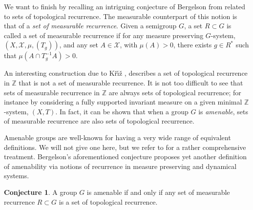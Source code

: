 \documentclass{amsart}
\numberwithin{equation}{section}
\theoremstyle{definition}
\newtheorem*{conjecture*}{Conjecture}
\theoremstyle{plain}
\newcommand{\Z}{{\mathbb Z}}
\begin{document}
We want to finish by recalling an intriguing conjecture 
of Bergelson 
from \cite{Bergelson} related to sets of topological 
recurrence. The measurable counterpart of this notion is
that of a \textit{set of measurable recurrence}. Given a 
semigroup $G$, a set $R\subset G$ is called a set of 
measurable recurrence if for any measure preserving 
$G$-system, $(X,\mathcal{X},\mu,(T_g))$, and any set $A\in \mathcal{X}$, with $\mu(A)>0$, there exists $g\in R^{*}$ such that $\mu(A\cap T_g^{-1}A)>0$. 

An interesting construction due to K\v{r}\'{\i}\v{z} \cite{Kriz}, describes a set of topological recurrence in $\Z$ that is
not a set of measurable recurrence. It is not too 
difficult to see that sets of measurable recurrence in 
$\Z$ are always sets of topological recurrence; for 
instance by considering a fully supported invariant 
measure on a given minimal $\Z$-system, $(X,T)$. In fact, 
it can be shown that when a group $G$ is \textit{amenable}, sets of measurable recurrence are also sets of topological recurrence. 

Amenable groups are well-known for having a very wide 
range of equivalent definitions. We will not give one here, 
but we refer to \cite{Pier} for a rather comprehensive treatment. 
Bergelson's aforementioned conjecture {\cite[Conjecture, p.55]{Bergelson}} 
proposes yet another definition of amenability via notions of recurrence in measure preserving and dynamical systems.

\begin{conjecture*}{\cite[Conjecture, p.55]{Bergelson}}
A group $G$ is amenable if and only if any set of measurable recurrence $R\subset G$ is a set of topological recurrence.    
\end{conjecture*}



 
\end{document}
